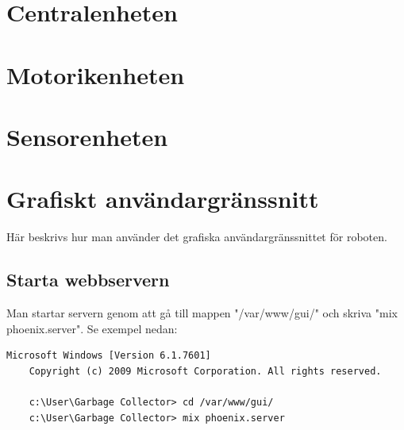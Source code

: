 \documentclass[a4paper,titlepage,12pt]{article}
\begin{document}
	
    \newpage
	\section{Centralenheten}
	

    \newpage
	\section{Motorikenheten}
	
	

	\section{Sensorenheten}

	

    \newpage
	\section{Grafiskt användargränssnitt}
	Här beskrivs hur man använder det grafiska användargränssnittet för roboten.
	
	\subsection{Starta webbservern}
	Man startar servern genom att gå till mappen "/var/www/gui/" och skriva "mix phoenix.server". Se exempel nedan:
	
	\begin{lstlisting}[style=DOS]
	Microsoft Windows [Version 6.1.7601]
	Copyright (c) 2009 Microsoft Corporation. All rights reserved.
	
	c:\User\Garbage Collector> cd /var/www/gui/
	c:\User\Garbage Collector> mix phoenix.server
	\end{lstlisting}
	
\end{document}
